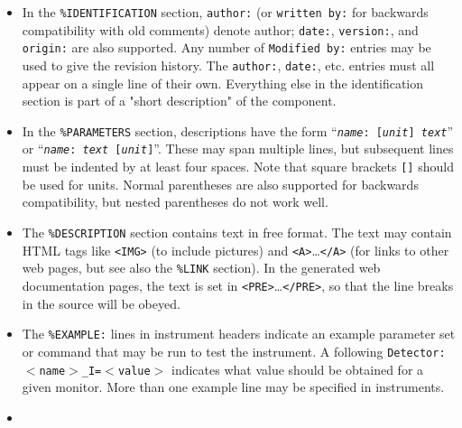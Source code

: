 \begin{itemize}
\item
  In the \verb+%IDENTIFICATION+
  section, \verb+author:+ (or \verb+written by:+ for backwards
  compatibility with old comments) denote author; \verb+date:+,
  \verb+version:+, and \verb+origin:+ are also supported. Any number of
  \verb+Modified by:+ entries may be used to give the revision history.
  The \verb+author:+, \verb+date:+, etc. entries must all
  appear on a single line of their own. Everything else in the
  identification section is part of a "short description" of the
  component.
\item
  In the \verb+%PARAMETERS+
  section, descriptions have the form
  \hbox{``\texttt{\textit{name\/}:~[\textit{unit\/}] \textit{text\/}}''}
  or \hbox{``\texttt{\textit{name\/}:~\textit{text\/} [\textit{unit\/}]}''}.
  These may span multiple lines, but subsequent lines must be
  indented by at least four spaces. Note that square brackets \verb+[]+ should
  be used for units. Normal parentheses are also supported for backwards
  compatibility, but nested parentheses do not work well.
\item
  The \verb+%DESCRIPTION+
  section contains text in free format. The text may contain HTML tags
  like \verb+<IMG>+ (to include pictures) and
  \verb+<A>+\ldots\verb+</A>+
  (for links to other web pages, but see also the \verb+%LINK+
  section). In the generated web documentation pages, the text is set in
  \verb+<PRE>+\ldots\verb+</PRE>+, so that the line breaks in the source
  will be obeyed.
\item 
  \sloppy
  The \verb+%EXAMPLE:+
  lines in instrument headers indicate an example parameter set or command that may be
  run to test the instrument. A following \texttt{Detector: $<$name$>$\_I=$<$value$>$}
  indicates what value should be obtained for a given monitor. More than one example
  line may be specified in instruments.
\item

\end{itemize}
